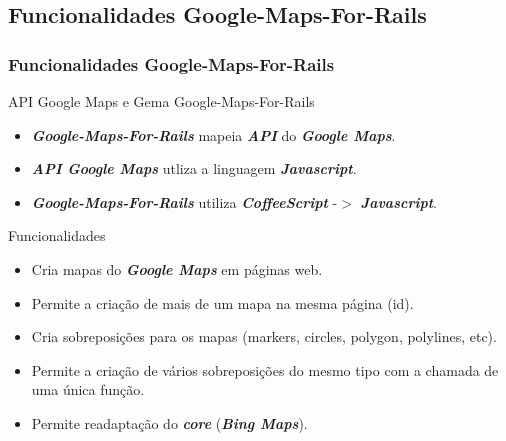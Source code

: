 \subsection{Funcionalidades Google-Maps-For-Rails}
\begin{frame}
 \frametitle{Funcionalidades Google-Maps-For-Rails}
  
  \begin{block}{API Google Maps e Gema Google-Maps-For-Rails}       
  
    \begin{itemize}        
    
     \item \emph{\textbf{Google-Maps-For-Rails}} mapeia \emph{\textbf{API}} do \emph{\textbf{Google Maps}}.
     
     \item \emph{\textbf{API Google Maps}} utliza a linguagem \emph{\textbf{Javascript}}.     

     \item \emph{\textbf{Google-Maps-For-Rails}} utiliza \emph{\textbf{CoffeeScript}} -$>$ \emph{\textbf{Javascript}}.     

    \end{itemize}

  \end{block}    
 
  \begin{block}{Funcionalidades}   

   \begin{itemize}

    \item  Cria mapas do \emph{\textbf{Google Maps}} em páginas web.

    \item  Permite a criação de mais de um mapa na mesma página (id).

    \item  Cria sobreposições para os mapas (markers, circles, polygon, polylines, etc).

    \item  Permite a criação de vários sobreposições do mesmo tipo com a chamada de uma única função.    

    \item  Permite readaptação do \emph{\textbf{core}} (\emph{\textbf{Bing Maps}}).

   \end{itemize}

  \end{block}

\end{frame}


